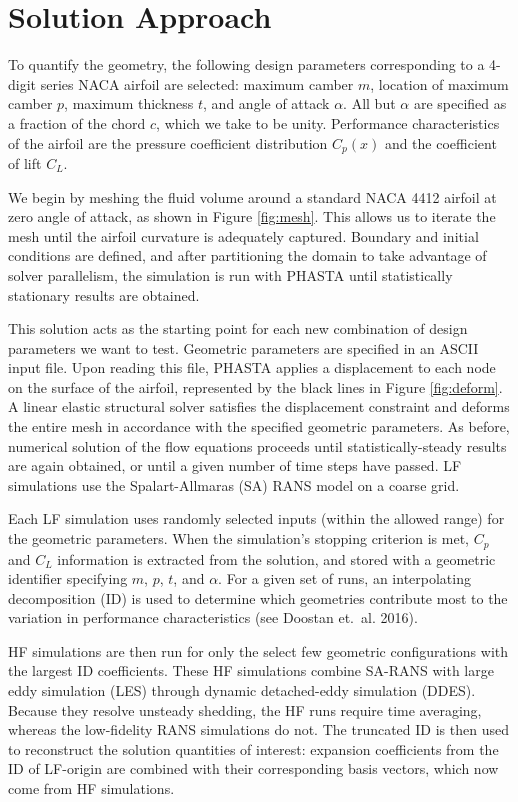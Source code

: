 \documentclass[11pt]{article}
\begin{document}
\section{Solution Approach}

To quantify the geometry, the following design parameters corresponding to a 4-digit series NACA airfoil are selected: maximum camber $m$, location of maximum camber $p$, maximum thickness $t$, and angle of attack $\alpha$. All but $\alpha$ are specified as a fraction of the chord $c$, which we take to be unity. Performance characteristics of the airfoil are the pressure coefficient distribution $C_p(x)$ and the coefficient of lift $C_L$.

We begin by meshing the fluid volume around a standard NACA 4412 airfoil at zero angle of attack, as shown in Figure \ref{fig:mesh}. This allows us to iterate the mesh until the airfoil curvature is adequately captured. Boundary and initial conditions are defined, and after partitioning the domain to take advantage of solver parallelism, the simulation is run with PHASTA until statistically stationary results are obtained.

This solution acts as the starting point for each new combination of design parameters we want to test. Geometric parameters are specified in an ASCII input file. Upon reading this file, PHASTA applies a displacement to each node on the surface of the airfoil, represented by the black lines in Figure \ref{fig:deform}. A linear elastic structural solver satisfies the displacement constraint and deforms the entire mesh in accordance with the specified geometric parameters. As before, numerical solution of the flow equations proceeds until statistically-steady results are again obtained, or until a given number of time steps have passed. LF simulations use the Spalart-Allmaras (SA) RANS model on a coarse grid.

Each LF simulation uses randomly selected inputs (within the allowed range) for the geometric parameters. When the simulation's stopping criterion is met, $C_p$ and $C_L$ information is extracted from the solution, and stored with a geometric identifier specifying $m$, $p$, $t$, and $\alpha$. For a given set of runs, an interpolating decomposition (ID) is used to determine which geometries contribute most to the variation in performance characteristics (see Doostan et.~al. 2016).

HF simulations are then run for only the select few geometric configurations with the largest ID coefficients. These HF simulations combine SA-RANS with large eddy simulation (LES) through dynamic detached-eddy simulation (DDES). Because they resolve unsteady shedding, the HF runs require time averaging, whereas the low-fidelity RANS simulations do not. The truncated ID is then used to reconstruct the solution quantities of interest: expansion coefficients from the ID of LF-origin are combined with their corresponding basis vectors, which now come from HF simulations.
\end{document}
